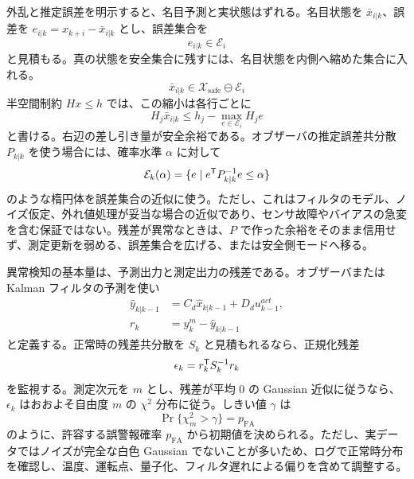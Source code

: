 外乱と推定誤差を明示すると、名目予測と実状態はずれる。名目状態を $\bar{x}_{i|k}$、誤差を $e_{i|k}=x_{k+i}-\bar{x}_{i|k}$ とし、誤差集合を
\begin{equation}
  e_{i|k}\in\mathcal{E}_i
\end{equation}
と見積もる。真の状態を安全集合に残すには、名目状態を内側へ縮めた集合に入れる。
\begin{equation}
  \bar{x}_{i|k}
  \in
  \mathcal{X}_{\mathrm{safe}}\ominus\mathcal{E}_i
\end{equation}
半空間制約 $Hx\le h$ では、この縮小は各行ごとに
\begin{equation}
  H_j\bar{x}_{i|k}
  \le
  h_j-\max_{e\in\mathcal{E}_i}H_je
\end{equation}
と書ける。右辺の差し引き量が安全余裕である。オブザーバの推定誤差共分散 $P_{k|k}$ を使う場合には、確率水準 $\alpha$ に対して
\begin{equation}
  \mathcal{E}_k(\alpha)
  =
  \{e\mid e^{\mathsf{T}} P_{k|k}^{-1}e\le\alpha\}
\end{equation}
のような楕円体を誤差集合の近似に使う。ただし、これはフィルタのモデル、ノイズ仮定、外れ値処理が妥当な場合の近似であり、センサ故障やバイアスの急変を含む保証ではない。残差が異常なときは、$P$ で作った余裕をそのまま信用せず、測定更新を弱める、誤差集合を広げる、または安全側モードへ移る。

異常検知の基本量は、予測出力と測定出力の残差である。オブザーバまたは Kalman フィルタの予測を使い
\begin{align}
  \hat{y}_{k|k-1}
  &=C_d\hat{x}_{k|k-1}+D_du_{k-1}^{act},\\
  r_k
  &=y_k^m-\hat{y}_{k|k-1}
\end{align}
と定義する。正常時の残差共分散を $S_k$ と見積もれるなら、正規化残差
\begin{equation}
  \epsilon_k=r_k^{\mathsf{T}} S_k^{-1}r_k
\end{equation}
を監視する。測定次元を $m$ とし、残差が平均 0 の Gaussian 近似に従うなら、$\epsilon_k$ はおおよそ自由度 $m$ の $\chi^2$ 分布に従う。しきい値 $\gamma$ は
\begin{equation}
  \Pr\{\chi_m^2>\gamma\}=p_{\mathrm{FA}}
\end{equation}
のように、許容する誤警報確率 $p_{\mathrm{FA}}$ から初期値を決められる。ただし、実データではノイズが完全な白色 Gaussian でないことが多いため、ログで正常時分布を確認し、温度、運転点、量子化、フィルタ遅れによる偏りを含めて調整する。

